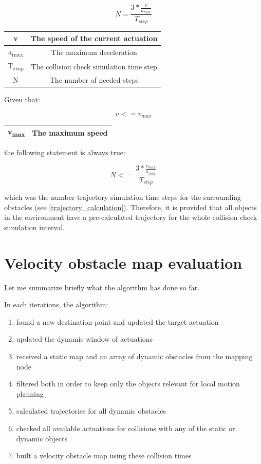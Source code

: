 \[ N = \frac{3 * \frac{v}{a_{max}}}{T_{step}} \]

\begin{center}
    \begin{tabular}{ | c | c | }
        \hline
        v						& The speed of the current actuation		\\
        \hline
        a\textsubscript{max}  	& The maximum deceleration      			\\
        \hline
        T\textsubscript{step}  	& The collision check simulation time step	\\
        \hline
        N  						& The number of needed steps				\\
        \hline
    \end{tabular}
\end{center}

Given that:

\[ v <= v_{max} \]

\begin{center}
    \begin{tabular}{ | c | c | }
        \hline
        v\textsubscript{max}	& The maximum speed		\\
        \hline
    \end{tabular}
\end{center}

the following statement is always true:

\[ N <= \frac{3 * \frac{v_{max}}{a_{max}}}{T_{step}} \]

which was the number trajectory simulation time steps for the surrounding obstacles (see \ref{trajectory_calculation}). Therefore, it is provided that all objects in the environment have a pre-calculated trajectory for the whole collision check simulation interval.

\begin{minipage}{\textwidth}
\section{Velocity obstacle map evaluation}
\label{chap:velocity_obstacle_map_evaluation}
Let me summarize briefly what the algorithm has done so far.

In each iterations, the algorithm:
\begin{enumerate}
  \item found a new destination point and updated the target actuation
  \item updated the dynamic window of actuations
  \item received a static map and an array of dynamic obstacles from the mapping node
  \item filtered both in order to keep only the objects relevant for local motion planning
  \item calculated trajectories for all dynamic obstacles
  \item checked all available actuations for collisions with any of the static or dynamic objects
  \item built a velocity obstacle map using these collision times
\end{enumerate}
\end{minipage}

